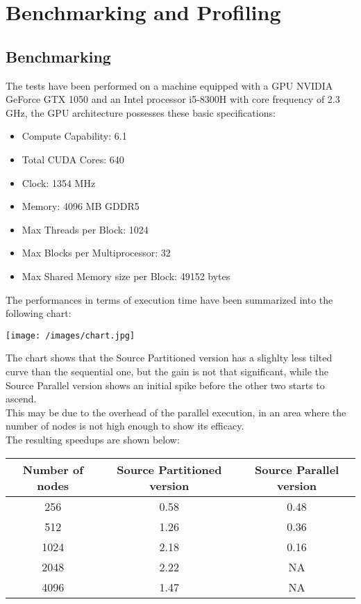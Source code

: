 \documentclass[
	a4paper, %
	12pt, %
]{class}
\begin{document}
\newpage
\section{Benchmarking and Profiling}
\subsection{Benchmarking}

The tests have been performed on a machine equipped with a GPU NVIDIA GeForce GTX 1050 and an Intel processor i5-8300H with core frequency of 2.3 GHz,
the GPU architecture possesses these basic specifications:\\

\begin{itemize}
    \item   Compute Capability: 6.1 
    \item   Total CUDA Cores: 640
    \item   Clock: 1354 MHz
    \item   Memory: 4096 MB GDDR5
    \item   Max Threads per Block: 1024
    \item   Max Blocks per Multiprocessor: 32
    \item   Max Shared Memory size per Block: 49152 bytes\\
\end{itemize}

The performances in terms of execution time have been summarized into the following chart:

\begin{center}
    \texttt{[image: /images/chart.jpg]}
\end{center}

The chart shows that the Source Partitioned version has a slighlty less tilted curve than the sequential one, but the gain is not
that significant, while the Source Parallel version shows an initial spike before the other two starts to ascend. \\

This may be due to the overhead of the parallel execution, in an area where the number of nodes is not high enough to show its efficacy. \\

The resulting speedups are shown below:

\begin{center}
    \begin{tabular}{ |c|c|c| }
    \hline
    \textbf{Number of nodes} & \textbf{Source Partitioned version} & \textbf{Source Parallel version} \\ \hline
    256 & 0.58  & 0.48 \\ \hline
    512 & 1.26 & 0.36 \\ \hline
    1024 & 2.18 & 0.16 \\ \hline
    2048 & 2.22 & NA \\ \hline
    4096 & 1.47 & NA \\ \hline
    \end{tabular}
\end{center}
\end{document}

